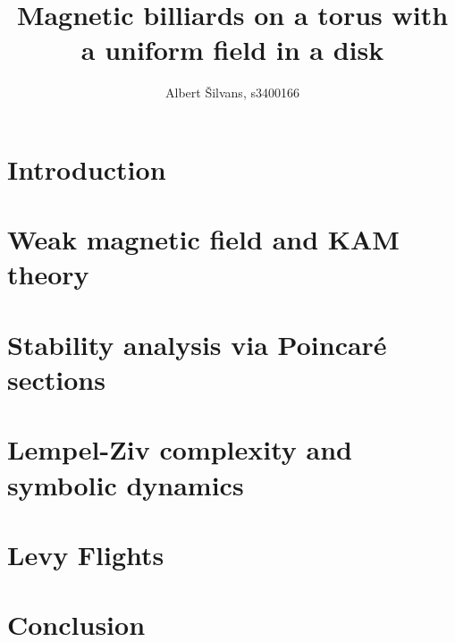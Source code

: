 \documentclass[notitlepage,twoside,a4paper,12pt]{article}
\title{Magnetic billiards on a torus with a uniform field in a disk}
\author{Albert \v{S}ilvans, s3400166}
\theoremstyle{definition}
\begin{document}
\maketitle
\newpage
\tableofcontents
\listoffigures
\newpage

\section{Introduction}







\section{Weak magnetic field and KAM theory}






\section{Stability analysis via Poincar\'e sections}



\section{Lempel-Ziv complexity and symbolic dynamics}



\section{Levy Flights}


\section{Conclusion}



\newpage


\end{document}
